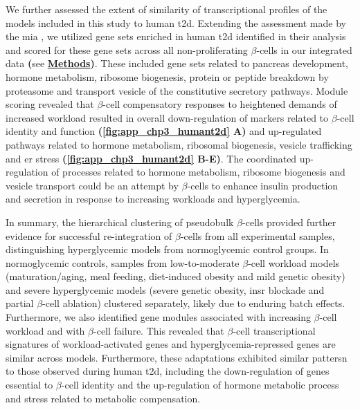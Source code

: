 \par We further assessed the extent of similarity of transcriptional profiles of the models included in this study to human \gls{t2d}. Extending the assessment made by the \gls{mia} \textbf{\cite{hrovatin_delineating_2023}}, we utilized gene sets enriched in human \gls{t2d} identified in their analysis and scored for these gene sets across all non-proliferating $\beta$-cells in our integrated data \textbf{(}see \hyperref[subsubsec:met_chp3_scoring]{\textbf{Methods}}\textbf{)}. These included gene sets related to pancreas development, hormone metabolism, ribosome biogenesis, protein or peptide breakdown by proteasome and transport vesicle of the constitutive secretory pathways. Module scoring revealed that $\beta$-cell compensatory responses to heightened demands of increased workload resulted in overall down-regulation of markers related to $\beta$-cell identity and function \textbf{(\autoref{fig:app_chp3_humant2d} A)} and up-regulated pathways related to hormone metabolism, ribosomal biogenesis, vesicle trafficking and \gls{er} stress \textbf{(\autoref{fig:app_chp3_humant2d} B-E)}. The coordinated up-regulation of processes related to hormone metabolism, ribosome biogenesis and vesicle transport could be an attempt by $\beta$-cells to enhance insulin production and secretion in response to increasing workloads and hyperglycemia.\\


\par In summary, the hierarchical clustering of pseudobulk $\beta$-cells provided further evidence for successful re-integration of $\beta$-cells from all experimental samples, distinguishing hyperglycemic models from normoglycemic control groups. In normoglycemic controls, samples from low-to-moderate $\beta$-cell workload models (maturation/aging, meal feeding, diet-induced obesity and mild genetic obesity) and severe hyperglycemic models (severe genetic obesity, \gls{insr} blockade and partial $\beta$-cell ablation) clustered separately, likely due to enduring batch effects. Furthermore, we also identified gene modules associated with increasing $\beta$-cell workload and with $\beta$-cell failure. This revealed that $\beta$-cell transcriptional signatures of workload-activated genes and hyperglycemia-repressed genes are similar across models. Furthermore, these adaptations exhibited similar pattersn to those observed during human \gls{t2d}, including the down-regulation of genes essential to $\beta$-cell identity and the up-regulation of hormone metabolic process and stress related to metabolic compensation.

